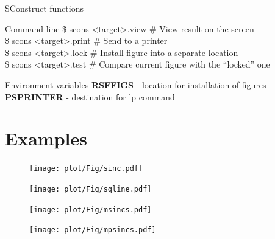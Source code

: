 \begin{frame}
  \begin{block}{SConstruct functions}
   
  \end{block}
  \begin{block}{Command line}
   \$ scons \textless target\textgreater.view \# View result on the screen \\
   \$ scons \textless target\textgreater.print \# Send to a printer \\
   \$ scons \textless target\textgreater.lock \# Install figure into a separate location \\
   \$ scons \textless target\textgreater.test \# Compare current figure with the ``locked'' one
  \end{block}
  \begin{block}{Environment variables}
   {\bf RSFFIGS} - location for installation of figures \\
   {\bf PSPRINTER} - destination for lp command
  \end{block}
\end{frame}

\section{Examples}

\begin{frame}
  \begin{figure}
  \texttt{[image: plot/Fig/sinc.pdf]}
  \end{figure}
\end{frame}

\begin{frame}
  \begin{figure}
  \texttt{[image: plot/Fig/sqline.pdf]}
  \end{figure}
\end{frame}

\begin{frame}
  \begin{figure}
  \texttt{[image: plot/Fig/msincs.pdf]}
  \end{figure}
\end{frame}

\begin{frame}
  \begin{figure}
  \texttt{[image: plot/Fig/mpsincs.pdf]}
  \end{figure}
\end{frame}

